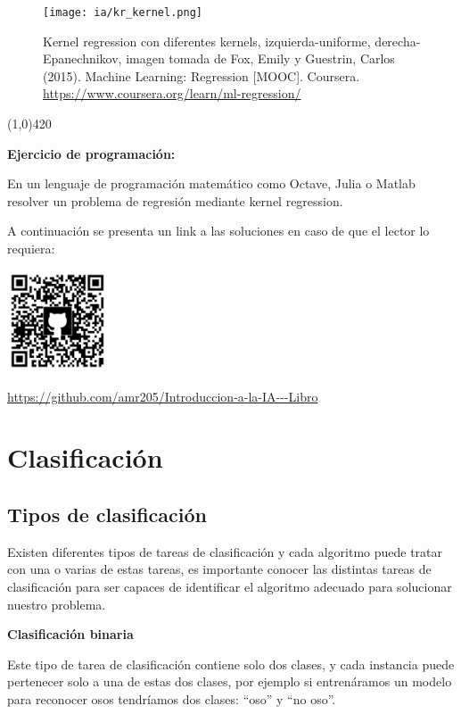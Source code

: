 \documentclass[11pt,fleqn]{book} %
\begin{document}
\begin{figure}[ht]
\centering\texttt{[image: ia/kr\_kernel.png]}
\caption{Kernel regression con diferentes kernels, izquierda-uniforme, derecha-Epanechnikov, imagen tomada de Fox, Emily y Guestrin, Carlos (2015). Machine Learning: Regression [MOOC]. Coursera. \url{https://www.coursera.org/learn/ml-regression/}}

\label{fig:kernel_regression_diff_kernels} 
\end{figure}
\FloatBarrier

\begin{center}
\line(1,0){420}
\end{center}

\textbf{Ejercicio de programación:}

En un lenguaje de programación matemático como Octave, Julia o Matlab resolver un problema de regresión mediante kernel regression.

A continuación se presenta un link a las soluciones en caso de que el lector lo requiera:

\includegraphics[width=3cm]{Pictures/github/libro-ia.png}

\url{https://github.com/amr205/Introduccion-a-la-IA---Libro}

\section{Clasificación} 

\subsection{Tipos de clasificación} 

Existen diferentes tipos de tareas de clasificación y cada algoritmo puede tratar con una o varias de estas tareas, es importante conocer las distintas tareas de clasificación para ser capaces de identificar el algoritmo adecuado para solucionar nuestro problema.

\textbf{Clasificación binaria}

Este tipo de tarea de clasificación contiene solo dos clases, y cada instancia puede pertenecer solo a una de estas dos clases, por ejemplo si entrenáramos un modelo para reconocer osos tendríamos dos clases: ``oso'' y ``no oso''.
\end{document}
